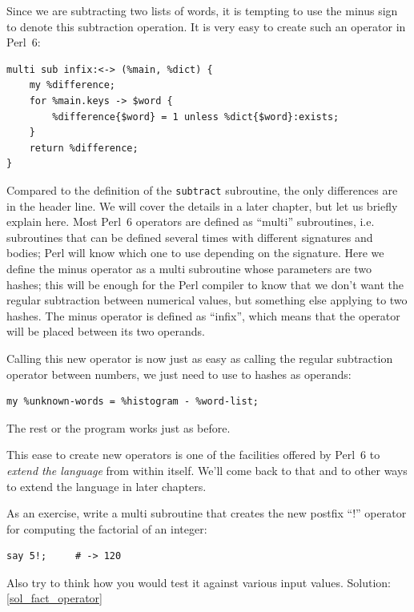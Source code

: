 Since we are subtracting two lists of words, it is tempting to 
use the minus sign to denote this subtraction operation. It  
is very easy to create such an operator in Perl~6:

\begin{verbatim}
multi sub infix:<-> (%main, %dict) {
	my %difference;
	for %main.keys -> $word {
		%difference{$word} = 1 unless %dict{$word}:exists;
	}
	return %difference;
}
\end{verbatim}


Compared to the definition of the {\tt subtract} subroutine, the 
only differences are in the header line. We will cover the 
details in a later chapter, but let us briefly explain here.
Most Perl~6 operators are defined as ``multi'' subroutines, 
i.e. subroutines that can be defined several times with 
different signatures and bodies; Perl will know which one to use depending 
on the signature. Here we define the minus operator as a 
multi subroutine whose parameters are two hashes; this will be 
enough for the Perl compiler to know that we don't want 
the regular subtraction between numerical values, but something 
else applying to two hashes. The minus operator is defined as 
``infix'', which means that the operator will be placed 
between its two operands.

Calling this new operator is now just as easy as calling 
the regular subtraction operator between numbers, we just need 
to use to hashes as operands:

\begin{verbatim}
my %unknown-words = %histogram - %word-list;
\end{verbatim}

The rest or the program works just as before.

This ease to create new operators is one of the facilities 
offered by Perl~6 to \emph{extend the language} from within itself. 
We'll come back to that and to other ways to extend the language 
in later chapters.

\label{fact_operator}
As an exercise, write a multi subroutine that creates the new 
postfix ``!'' operator for computing the factorial of an integer:

\begin{verbatim}
say 5!;     # -> 120
\end{verbatim}
%
Also try to think how you would test it against various input values.
Solution: \ref{sol_fact_operator}


